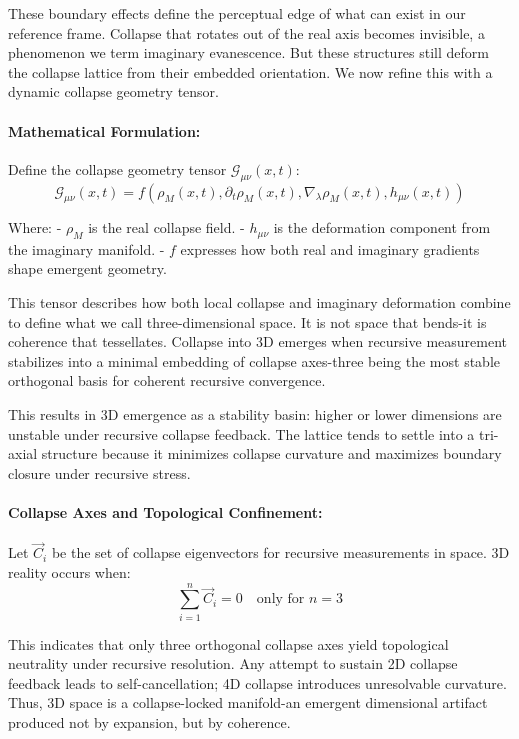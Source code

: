 These boundary effects define the perceptual edge of what can exist in our reference frame. Collapse that rotates out of the real axis becomes invisible, a phenomenon we term imaginary evanescence. But these structures still deform the collapse lattice from their embedded orientation. We now refine this with a dynamic collapse geometry tensor.

\paragraph{Mathematical Formulation:}\cite{chapter8_meta}
Define the collapse geometry tensor \( \mathcal{G}_{\mu\nu}(x,t) \):
\begin{equation}
\mathcal{G}_{\mu\nu}(x,t) = f\left(\rho_M(x,t), \partial_t \rho_M(x,t), \nabla_\lambda \rho_M(x,t), h_{\mu\nu}(x,t)\right)
\end{equation}

Where:
- \( \rho_M \) is the real collapse field.
- \( h_{\mu\nu} \) is the deformation component from the imaginary manifold.
- \( f \) expresses how both real and imaginary gradients shape emergent geometry.

This tensor describes how both local collapse and imaginary deformation combine to define what we call three-dimensional space. It is not space that bends-it is coherence that tessellates. Collapse into 3D emerges when recursive measurement stabilizes into a minimal embedding of collapse axes-three being the most stable orthogonal basis for coherent recursive convergence.

This results in 3D emergence as a stability basin: higher or lower dimensions are unstable under recursive collapse feedback. The lattice tends to settle into a tri-axial structure because it minimizes collapse curvature and maximizes boundary closure under recursive stress.

\paragraph{Collapse Axes and Topological Confinement:}\cite{chapter8_meta}
Let \( \vec{C}_i \) be the set of collapse eigenvectors for recursive measurements in space. 3D reality occurs when:
\[
\sum_{i=1}^{n} \vec{C}_i = 0 \quad \text{only for } n=3
\]

This indicates that only three orthogonal collapse axes yield topological neutrality under recursive resolution. Any attempt to sustain 2D collapse feedback leads to self-cancellation; 4D collapse introduces unresolvable curvature. Thus, 3D space is a collapse-locked manifold-an emergent dimensional artifact produced not by expansion, but by coherence.

